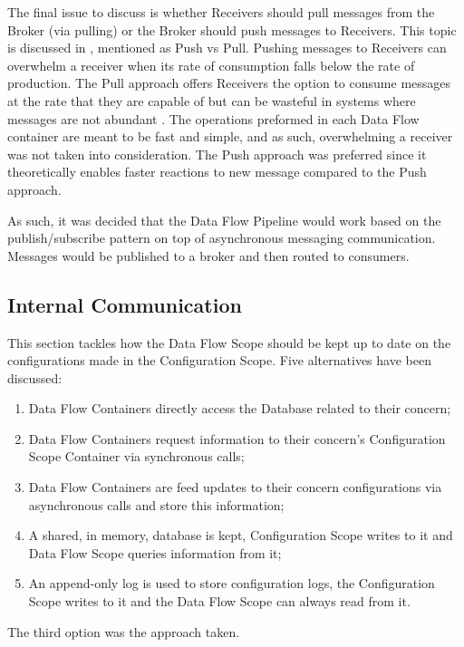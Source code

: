 The final issue to discuss is whether Receivers should pull messages from the Broker (via pulling) or the Broker should push messages to Receivers. This topic is discussed in , mentioned as Push vs Pull. Pushing messages to Receivers can overwhelm a receiver when its rate of consumption falls below the rate of production. The Pull approach offers Receivers the option to consume messages at the rate that they are capable of but can be wasteful in systems where messages are not abundant \parencite{pubsubpushpullrab}. The operations preformed in each Data Flow container are meant to be fast and simple, and as such, overwhelming a receiver was not taken into consideration. The Push approach was preferred since it theoretically enables faster reactions to new message compared to the Push approach.

As such, it was decided that the Data Flow Pipeline would work based on the publish/subscribe pattern on top of asynchronous messaging communication. Messages would be published to a broker and then routed to consumers.

\subsection{Internal Communication}
\label{subsec:design:alternatives:internal}

This section tackles how the Data Flow Scope should be kept up to date on the configurations made in the Configuration Scope. Five alternatives have been discussed:

\begin{enumerate}
   \item Data Flow Containers directly access the Database related to their concern;
   \item Data Flow Containers request information to their concern's Configuration Scope Container via synchronous calls;
   \item Data Flow Containers are feed updates to their concern configurations via asynchronous calls and store this information;
   \item A shared, in memory, database is kept, Configuration Scope writes to it and Data Flow Scope queries information from it;
   \item An append-only log is used to store configuration logs, the Configuration Scope writes to it and the Data Flow Scope can always read from it.
\end{enumerate}

The third option was the approach taken.

